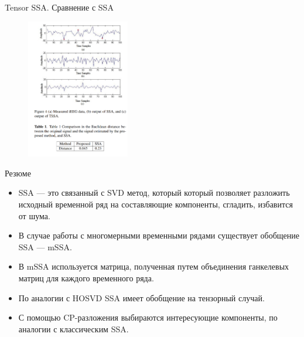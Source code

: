 \begin{frame}{Tensor SSA. Сравнение с SSA}
\begin{figure}
    \centering
    \includegraphics[width=0.4\textwidth]{lecture_14/figs/result_tssa.png}
\end{figure}
\end{frame}
\begin{frame}{Резюме}
\begin{itemize}
    \item SSA --- это связанный с SVD метод, который который позволяет разложить исходный  временной ряд на составляющие компоненты, сгладить, избавится от шума.
    \item В случае работы с многомерными временными рядами существует обобщение SSA --- mSSA.
    \item В mSSA используется матрица, полученная путем объединения ганкелевых матриц для каждого временного ряда.
    \item По аналогии с HOSVD SSA имеет обобщение на тензорный случай.
    \item С помощью CP-разложения выбираются интересующие компоненты, по аналогии с классическим SSA.
\end{itemize}
\end{frame}
 